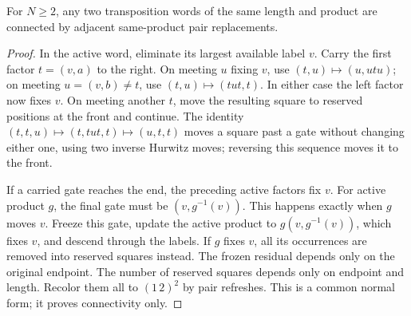 \begin{lemma}
\label{lem:all-endpoint-pair-connectivity}
For $N\ge2$, any two transposition words of the same length and product
are connected by adjacent same-product pair replacements.
\end{lemma}
\begin{proof}
In the active word, eliminate its largest available label $v$.  Carry
the first factor $t=(v,a)$ to the right.  On meeting $u$ fixing $v$, use
$(t,u)\mapsto(u,utu)$; on meeting $u=(v,b)\ne t$, use
$(t,u)\mapsto(tut,t)$.  In either case the left factor now fixes $v$.
On meeting another $t$, move the resulting square to reserved positions
at the front and continue.  The identity
$(t,t,u)\mapsto(t,tut,t)\mapsto(u,t,t)$ moves a square past a gate
without changing either one, using two inverse Hurwitz moves; reversing
this sequence moves it to the front.

If a carried gate reaches the end, the preceding active factors fix
$v$.  For active product $g$, the final gate must be
$(v,g^{-1}(v))$.  This happens exactly when $g$ moves $v$.  Freeze this
gate, update the active product to $g(v,g^{-1}(v))$, which fixes $v$,
and descend through the labels.  If $g$ fixes $v$, all its occurrences
are removed into reserved squares instead.  The frozen residual depends
only on the original endpoint.  The number of reserved squares depends
only on endpoint and length.  Recolor them all to $(1\,2)^2$ by pair
refreshes.  This is a common normal form; it proves connectivity only.
\end{proof}

